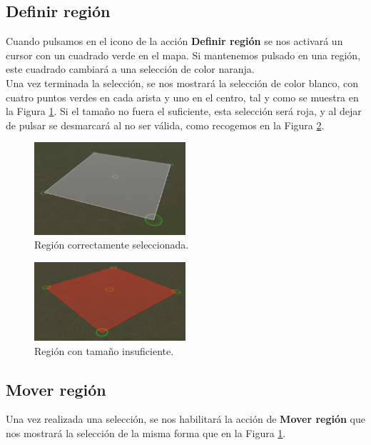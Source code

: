 \subsection{Definir región}

Cuando pulsamos en el icono de la acción \textbf{Definir región} se nos activará un cursor con un cuadrado verde en el mapa. Si mantenemos pulsado en una región, este cuadrado cambiará a una selección de color naranja. \\

Una vez terminada la selección, se nos mostrará la selección de color blanco, con cuatro puntos verdes en cada arista y uno en el centro, tal y como se muestra en la Figura \ref{fig:selection}. Si el tamaño no fuera el suficiente, esta selección será roja, y al dejar de pulsar se desmarcará al no ser válida, como recogemos en la Figura \ref{fig:bad-selection}.

\begin{figure}[h]
	\centering
	\includegraphics[width=0.5\textwidth]{images/selection}
	\caption{Región correctamente seleccionada.}
	\label{fig:selection}
\end{figure}

\begin{figure}[h]
	\centering
	\includegraphics[width=0.5\textwidth]{images/bad-selection}
	\caption{Región con tamaño insuficiente.}
	\label{fig:bad-selection}
\end{figure}

\subsection{Mover región}

Una vez realizada una selección, se nos habilitará la acción de \textbf{Mover región} que nos mostrará la selección de la misma forma que en la Figura \ref{fig:selection}. \\

